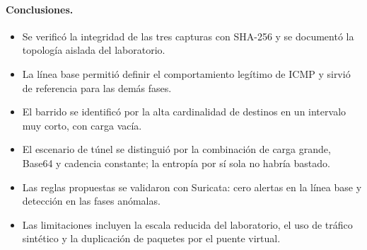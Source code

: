 \paragraph{Conclusiones.}
\begin{itemize}
	\item Se verificó la integridad de las tres capturas con SHA-256 y se documentó la topología aislada del laboratorio.
	\item La línea base permitió definir el comportamiento legítimo de ICMP y sirvió de referencia para las demás fases.
	\item El barrido se identificó por la alta cardinalidad de destinos en un intervalo muy corto, con carga vacía.
	\item El escenario de túnel se distinguió por la combinación de carga grande, Base64 y cadencia constante; la entropía por sí sola no habría bastado.
	\item Las reglas propuestas se validaron con Suricata: cero alertas en la línea base y detección en las fases anómalas.
	\item Las limitaciones incluyen la escala reducida del laboratorio, el uso de tráfico sintético y la duplicación de paquetes por el puente virtual.
\end{itemize}

